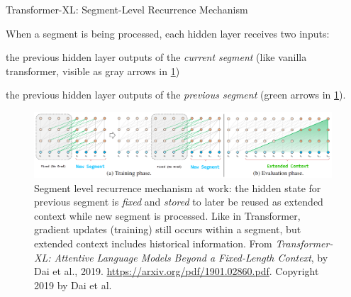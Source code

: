 \begin{frame}{Transformer-XL: Segment-Level Recurrence Mechanism}

    \vspace{20pt}
    
    When a segment is being processed, each hidden layer receives two inputs: 
    
    \begin{itemizeSpaced}{5pt}
        \item the previous hidden layer outputs of the \emph{current segment} (like vanilla transformer, visible as gray arrows in \cref{fig:transXL_extendedContext})
        
        \item the previous hidden layer outputs of the \emph{previous segment} (green arrows in \cref{fig:transXL_extendedContext}).
    \end{itemizeSpaced}
    
    
    
    \begin{figure}[h]
    \vspace{-5pt}
    \centering
    \includegraphics[width=0.99\textwidth]{imgs/transXL_extendedcontext.png}
    \caption{ Segment level recurrence mechanism at work: the hidden state for previous segment is \emph{fixed} and \emph{stored} to later be reused as extended context while new segment is processed. Like in Transformer, gradient updates (training) still occurs within a segment, but extended context includes historical information. From \emph{Transformer-XL: Attentive Language Models Beyond a Fixed-Length Context}, by Dai et al., 2019. \url{https://arxiv.org/pdf/1901.02860.pdf}. Copyright 2019 by Dai et al.}
    \label{fig:transXL_extendedContext}
    \end{figure}
    
\end{frame}



